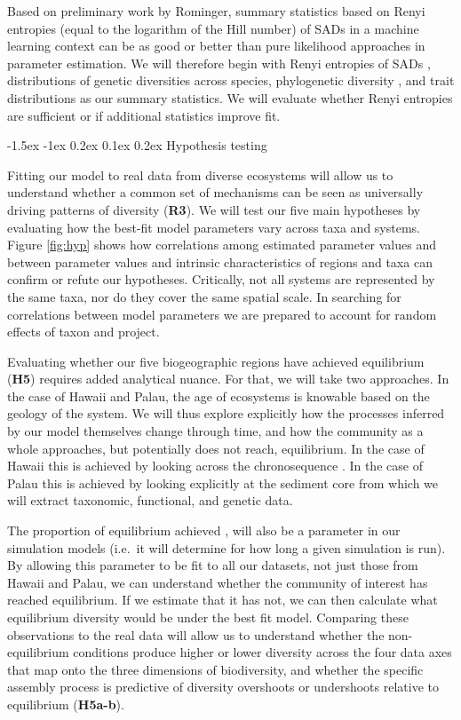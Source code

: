 \documentclass[11pt]{article}
\makeatletter
\renewcommand\subsubsection{\@startsection{subsection}{1}{\z@}%
                                  {-1.5ex \@plus -1ex \@minus 0.2ex}%
                                  {0.1ex \@plus 0.2ex}%
                                  {\normalfont\bfseries}}
\makeatother
\begin{document}
Based on preliminary work by Rominger, summary statistics based on Renyi
entropies (equal to the logarithm of the Hill number) of SADs in a
machine learning context can be as good or better than pure likelihood
approaches in parameter estimation. We will therefore begin with Renyi
entropies of SADs \cite{May2017-ji}, distributions of genetic
diversities across species, phylogenetic diversity \cite{Chao2010-oo},
and trait distributions as our summary statistics. We will evaluate
whether Renyi entropies are sufficient or if additional statistics
improve fit.

\subsubsection{Hypothesis testing}\label{hypothesis-testing}

Fitting our model to real data from diverse ecosystems will allow us
to understand whether a common set of mechanisms can be seen as
universally driving patterns of diversity (\textbf{R3}). We will test
our five main hypotheses by evaluating how the best-fit model
parameters vary across taxa and systems. Figure \ref{fig:hyp} shows
how correlations among estimated parameter values and between
parameter values and intrinsic characteristics of regions and taxa can
confirm or refute our hypotheses. Critically, not all systems are
represented by the same taxa, nor do they cover the same spatial
scale. In searching for correlations between model parameters we are
prepared to account for random effects of taxon and project.

Evaluating whether our five biogeographic regions have achieved
equilibrium (\textbf{H5}) requires added analytical nuance. For that,
we will take two approaches. In the case of Hawaii and Palau, the age
of ecosystems is knowable based on the geology of the system. We will
thus explore explicitly how the processes inferred by our model
themselves change through time, and how the community as a whole
approaches, but potentially does not reach, equilibrium. In the case
of Hawaii this is achieved by looking across the chronosequence
\cite{Rominger2015-kb}. In the case of Palau this is achieved by
looking explicitly at the sediment core from which we will extract
taxonomic, functional, and genetic data.

The proportion of equilibrium achieved
\citep[sensu][]{Rosindell2013-di}, will also be a parameter in our
simulation models (i.e.~it will determine for how long a given
simulation is run). By allowing this parameter to be fit to all our
datasets, not just those from Hawaii and Palau, we can understand
whether the community of interest has reached equilibrium. If we
estimate that it has not, we can then calculate what equilibrium
diversity would be under the best fit model. Comparing these
observations to the real data will allow us to understand whether the
non-equilibrium conditions produce higher or lower diversity across
the four data axes that map onto the three dimensions of biodiversity,
and whether the specific assembly process is predictive of diversity
overshoots or undershoots relative to equilibrium (\textbf{H5a-b}).
\end{document}
